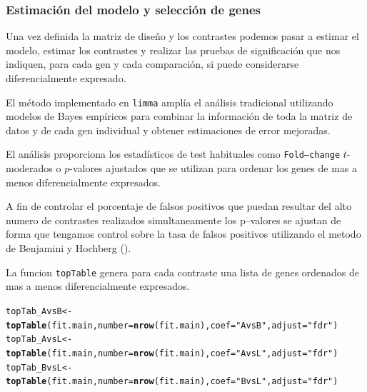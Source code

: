 \documentclass[a4paper]{article}\usepackage[]{graphicx}\usepackage[]{color}
\makeatletter
\newcommand{\hlstr}[1]{\textcolor[rgb]{0.192,0.494,0.8}{#1}}%
\newcommand{\hlstd}[1]{\textcolor[rgb]{0.345,0.345,0.345}{#1}}%
\newcommand{\hlkwb}[1]{\textcolor[rgb]{0.69,0.353,0.396}{#1}}%
\newcommand{\hlkwc}[1]{\textcolor[rgb]{0.333,0.667,0.333}{#1}}%
\newcommand{\hlkwd}[1]{\textcolor[rgb]{0.737,0.353,0.396}{\textbf{#1}}}%
\newenvironment{kframe}{%
 \def\at@end@of@kframe{}%
 \ifinner\ifhmode%
  \def\at@end@of@kframe{\end{minipage}}%
  \begin{minipage}{\columnwidth}%
 \fi\fi%
 \def\FrameCommand##1{\hskip\@totalleftmargin \hskip-\fboxsep
 \colorbox{shadecolor}{##1}\hskip-\fboxsep
     \hskip-\linewidth \hskip-\@totalleftmargin \hskip\columnwidth}%
 \MakeFramed {\advance\hsize-\width
   \@totalleftmargin\z@ \linewidth\hsize
   \@setminipage}}%
 {\par\unskip\endMakeFramed%
 \at@end@of@kframe}
\newenvironment{knitrout}{}{} %
\newcommand{\Rpackage}[1]{{\texttt{#1}}}
\makeatother
\begin{document}
\subsubsection{Estimación del modelo y selección de genes}

Una vez definida la matriz de diseño y los contrastes podemos pasar a estimar 
el modelo, estimar los contrastes y realizar las pruebas de significación 
que nos indiquen, para cada gen y cada comparación, 
si puede considerarse diferencialmente expresado.



El método implementado en \Rpackage {limma} amplía el análisis tradicional 
utilizando modelos de Bayes empíricos para combinar la información de toda la matriz de datos y de cada gen individual y  obtener estimaciones de error mejoradas.

El análisis proporciona los estadísticos de test habituales como \texttt{Fold--change}
$t$-moderados o $p$-valores ajustados que se utilizan para ordenar los genes de mas a menos diferencialmente expresados.

A fin de controlar el porcentaje de falsos positivos que puedan resultar del alto numero de contrastes realizados simultaneamente
los p--valores se ajustan de forma que tengamos control sobre la tasa de falsos positivos utilizando el metodo 
de Benjamini y Hochberg (\cite{BenjaminiHochberg:1995}). 

La funcion \texttt{topTable} genera para cada contraste una lista de genes 
ordenados de mas a menos diferencialmente expresados.

\begin{knitrout}
\color{fgcolor}\begin{kframe}
\begin{alltt}
\hlstd{topTab_AvsB} \hlkwb{<-} \hlkwd{topTable} \hlstd{(fit.main,} \hlkwc{number}\hlstd{=}\hlkwd{nrow}\hlstd{(fit.main),} \hlkwc{coef}\hlstd{=}\hlstr{"AvsB"}\hlstd{,} \hlkwc{adjust}\hlstd{=}\hlstr{"fdr"}\hlstd{)}
\hlstd{topTab_AvsL} \hlkwb{<-} \hlkwd{topTable} \hlstd{(fit.main,} \hlkwc{number}\hlstd{=}\hlkwd{nrow}\hlstd{(fit.main),} \hlkwc{coef}\hlstd{=}\hlstr{"AvsL"}\hlstd{,} \hlkwc{adjust}\hlstd{=}\hlstr{"fdr"}\hlstd{)}
\hlstd{topTab_BvsL}  \hlkwb{<-} \hlkwd{topTable} \hlstd{(fit.main,} \hlkwc{number}\hlstd{=}\hlkwd{nrow}\hlstd{(fit.main) ,} \hlkwc{coef}\hlstd{=}\hlstr{"BvsL"}\hlstd{,} \hlkwc{adjust}\hlstd{=}\hlstr{"fdr"}\hlstd{)}
\end{alltt}
\end{kframe}
\end{knitrout}
\end{document}
